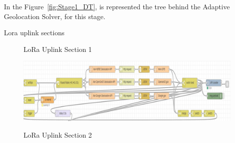  In the Figure~\ref{fig:Stage1_DT}, is represented the tree behind the Adaptive Geolocation Solver, for this stage. 
 \newline\newline\newline 


Lora uplink sections
       \begin{figure}[htbp]
      \centering
      \caption{LoRa Uplink  Section 1}
      \label{fig:LoRa_Uplink_Sec1}
    \end{figure}
    \begin{figure}[htbp]
      \centering
     
        {\includegraphics[width=\linewidth]{Chapters/Figures/sec2.png}}
    
      \caption{LoRa Uplink  Section 2}
      \label{fig:LoRa_Uplink_Sec2}
    \end{figure}
